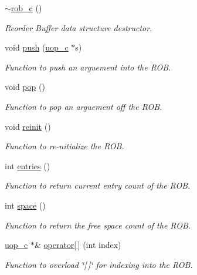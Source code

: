 \begin{DoxyCompactItemize}
\item 
\hyperlink{classrob__c_a8234eee835493946b51d12f6203b1f45}{$\sim$rob\_\-c} ()
\begin{DoxyCompactList}\small\item\em Reorder Buffer data structure destructor. \item\end{DoxyCompactList}\item 
void \hyperlink{classrob__c_a86f6d806468ba6fd74ed1eb39dbd5d2e}{push} (\hyperlink{classuop__c}{uop\_\-c} $\ast$s)
\begin{DoxyCompactList}\small\item\em Function to push an arguement into the ROB. \item\end{DoxyCompactList}\item 
void \hyperlink{classrob__c_abc83fd479320491b7d5eab296c0ef2fa}{pop} ()
\begin{DoxyCompactList}\small\item\em Function to pop an arguement off the ROB. \item\end{DoxyCompactList}\item 
void \hyperlink{classrob__c_a0a92a8da241c352e7379815f12d06f88}{reinit} ()
\begin{DoxyCompactList}\small\item\em Function to re-\/nitialize the ROB. \item\end{DoxyCompactList}\item 
int \hyperlink{classrob__c_ab9743ad1eb89efdf33aec7735da5449c}{entries} ()
\begin{DoxyCompactList}\small\item\em Function to return current entry count of the ROB. \item\end{DoxyCompactList}\item 
int \hyperlink{classrob__c_aeded9cab23c8972afe7d1105bd0c83c2}{space} ()
\begin{DoxyCompactList}\small\item\em Function to return the free space count of the ROB. \item\end{DoxyCompactList}\item 
\hyperlink{classuop__c}{uop\_\-c} $\ast$\& \hyperlink{classrob__c_a297700fa1105dbd9f118c2de4fa01143}{operator\mbox{[}$\,$\mbox{]}} (int index)
\begin{DoxyCompactList}\small\item\em Function to overload \char`\"{}\mbox{[}$\,$\mbox{]}\char`\"{} for indexing into the ROB. \item\end{DoxyCompactList}\item 

\end{DoxyCompactItemize}
